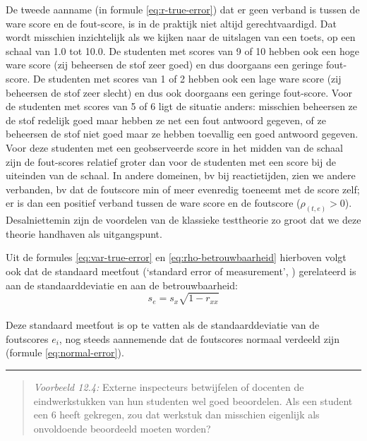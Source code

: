 \documentclass[
]{book}
\begin{document}
De tweede aanname (in formule \eqref{eq:r-true-error}) dat er geen verband is tussen de ware
score en de fout-score, is in de praktijk niet altijd gerechtvaardigd.
Dat wordt misschien inzichtelijk als we kijken naar de uitslagen van een
toets, op een schaal van 1.0 tot 10.0. De studenten met scores van 9 of
10 hebben ook een hoge ware score (zij beheersen de stof zeer goed) en
dus doorgaans een geringe fout-score. De studenten met scores van 1 of 2
hebben ook een lage ware score (zij beheersen de stof zeer slecht) en
dus ook doorgaans een geringe fout-score. Voor de studenten met scores
van 5 of 6 ligt de situatie anders: misschien beheersen ze de stof
redelijk goed maar hebben ze net een fout antwoord gegeven, of ze
beheersen de stof niet goed maar ze hebben toevallig een goed antwoord
gegeven. Voor deze studenten met een geobserveerde score in het midden
van de schaal zijn de fout-scores relatief groter dan voor de studenten
met een score bij de uiteinden van de schaal. In andere domeinen, bv bij
reactietijden, zien we andere verbanden, bv dat de foutscore min of meer
evenredig toeneemt met de score zelf; er is dan een positief verband
tussen de ware score en de foutscore (\(\rho_{(t,e)}>0\)). Desalniettemin
zijn de voordelen van de klassieke testtheorie zo groot dat we deze
theorie handhaven als uitgangspunt.

Uit de formules \eqref{eq:var-true-error} en \eqref{eq:rho-betrouwbaarheid}
hierboven volgt ook dat de standaard
meetfout (`standard error of measurement', ) gerelateerd is aan de
standaarddeviatie en aan de betrouwbaarheid:
\begin{equation}
   \label{eq:standaard-meetfout}
    s_e = s_x \sqrt{1-r_{xx}}
\end{equation}\\
Deze standaard meetfout is op te vatten
als de standaarddeviatie van de foutscores \(e_i\), nog steeds aannemende
dat de foutscores normaal verdeeld zijn (formule \eqref{eq:normal-error}).

\begin{center}\rule{0.5\linewidth}{0.5pt}\end{center}

\begin{quote}
\emph{Voorbeeld 12.4:}
Externe inspecteurs betwijfelen of docenten de eindwerkstukken van hun
studenten wel goed beoordelen. Als een student een 6 heeft gekregen, zou
dat werkstuk dan misschien eigenlijk als onvoldoende beoordeeld moeten
worden?
\end{quote}
\end{document}
